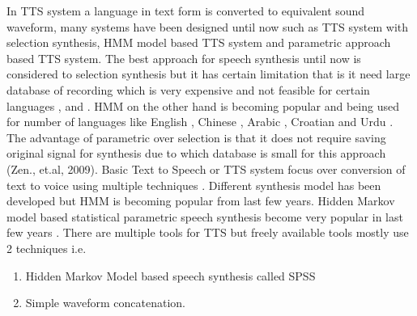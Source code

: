 In TTS system a language in text form is converted to equivalent sound waveform, many systems have been designed until
now such as TTS system with selection synthesis, HMM model based TTS system and parametric approach based TTS
system. The best approach for speech synthesis until now is considered to selection synthesis but it has certain limitation that
is it need large database of recording which is very expensive and not feasible for certain languages \cite{black1994chatr}, \cite{hunt1996unit} and 
\cite{black2003unit}. HMM on the other hand is becoming popular and being used for number of languages like English \cite{tokuda2002hmm}, Chinese \cite{qian2006hmm}, 
Arabic \cite{abdel2006improving}, Croatian \cite{martincic2006croatian} and
Urdu \cite{ahmed2014hmm}. The advantage of parametric over selection is that it does not require saving original signal for
synthesis due to which database is small for this approach (Zen., et.al, 2009). Basic Text to Speech or TTS system focus over
conversion of text to voice using multiple techniques \cite{merritt2013investigating}. Different synthesis model has been
developed but HMM is becoming popular from last few years. Hidden
Markov model based statistical parametric speech synthesis become very popular in last few years \cite{ze2013statistical}. There
are multiple tools for TTS but freely available tools mostly use 2 techniques i.e.

\begin{enumerate}
	\item Hidden Markov Model based speech synthesis called SPSS
	\item Simple waveform concatenation.
\end{enumerate}

